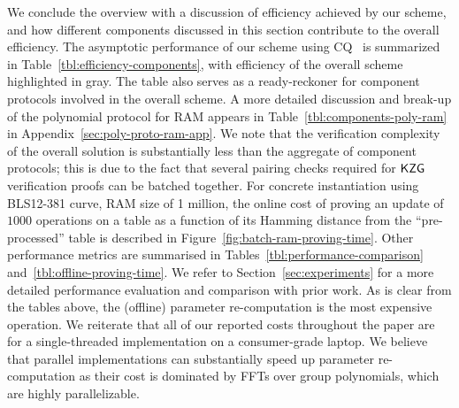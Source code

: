  We conclude the overview with a discussion of efficiency achieved by our scheme, and
how different components discussed in this section contribute to the overall efficiency. The asymptotic performance
of our scheme using CQ~\cite{EPRINT:EagFioGab22} is summarized in Table~\ref{tbl:efficiency-components}, with
efficiency of the overall scheme highlighted in gray. The table also serves as a ready-reckoner for component protocols
involved in the overall scheme. A more detailed discussion and break-up of the polynomial protocol for RAM
appears in Table~\ref{tbl:components-poly-ram} in Appendix~\ref{sec:poly-proto-ram-app}. We note that the verification complexity of the overall solution is substantially
less than the aggregate of component protocols; this is due to the fact that several pairing checks required for
$\mathsf{KZG}$ verification proofs can be batched together. For concrete instantiation using BLS12-381 curve, RAM size
of 1 million, the online cost of proving an update of $1000$ operations on a table as a function of its
Hamming distance from the ``pre-processed'' table is described in Figure~\ref{fig:batch-ram-proving-time}.
Other performance metrics are summarised in Tables~\ref{tbl:performance-comparison} and~\ref{tbl:offline-proving-time}.
We refer to Section~\ref{sec:experiments} for a more detailed performance evaluation and comparison with prior work.
As is clear from the tables above, the (offline) parameter re-computation is the most expensive operation.
We reiterate that all of our reported costs throughout the paper are for a single-threaded implementation on a consumer-grade laptop.
We believe that parallel implementations can
substantially speed up parameter re-computation as their cost is dominated by FFTs over group polynomials, which
are highly parallelizable.

\smallskip


